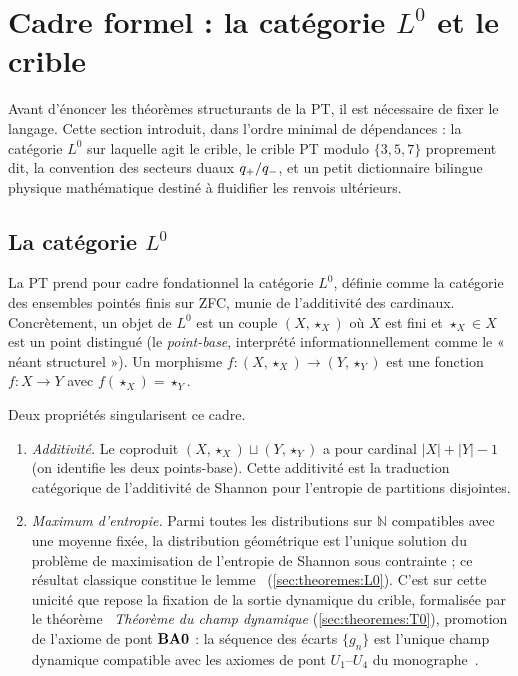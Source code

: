 \section{Cadre formel : la catégorie \texorpdfstring{$L^0$}{L0} et le crible}
\label{sec:cadre}

Avant d'énoncer les théorèmes structurants de la PT, il est nécessaire de fixer le langage. Cette section introduit, dans l'ordre minimal de dépendances : la catégorie $L^0$ sur laquelle agit le crible, le crible PT modulo $\{3,5,7\}$ proprement dit, la convention des secteurs duaux $q_{+} / q_{-}$, et un petit dictionnaire bilingue physique\,\textendash\,mathématique destiné à fluidifier les renvois ultérieurs.

\subsection{La catégorie \texorpdfstring{$L^0$}{L0}}
\label{sec:cadre:l0}

La PT prend pour cadre fondationnel la catégorie $L^0$, définie comme la catégorie des ensembles pointés finis sur ZFC, munie de l'additivité des cardinaux. Concrètement, un objet de $L^0$ est un couple $(X, \star_X)$ où $X$ est fini et $\star_X \in X$ est un point distingué (le \emph{point-base}, interprété informationnellement comme le « néant structurel »). Un morphisme $f : (X, \star_X) \to (Y, \star_Y)$ est une fonction $f : X \to Y$ avec $f(\star_X) = \star_Y$.

Deux propriétés singularisent ce cadre.

\begin{enumerate}[leftmargin=*,itemsep=2pt]
\item \emph{Additivité.} Le coproduit $(X, \star_X) \sqcup (Y, \star_Y)$ a pour cardinal $|X| + |Y| - 1$ (on identifie les deux points-base). Cette additivité est la traduction catégorique de l'additivité de Shannon pour l'entropie de partitions disjointes.

\item \emph{Maximum d'entropie.} Parmi toutes les distributions sur $\mathbb{N}$ compatibles avec une moyenne fixée, la distribution géométrique est l'unique solution du problème de maximisation de l'entropie de Shannon sous contrainte ; ce résultat classique constitue le lemme~\Lzero{} (\ref{sec:theoremes:L0}). C'est sur cette unicité que repose la fixation de la sortie dynamique du crible, formalisée par le théorème~\Tzero{} \emph{Théorème du champ dynamique} (\ref{sec:theoremes:T0}), promotion de l'axiome de pont $\textbf{BA0}$ : la séquence des écarts $\{g_n\}$ est l'unique champ dynamique compatible avec les axiomes de pont $U_1$--$U_4$ du monographe~\cite{PT_Monograph}.
\end{enumerate}

